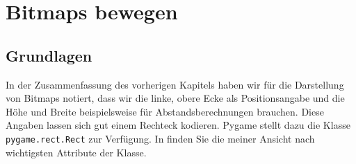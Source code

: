 \newpage
\section{Bitmaps bewegen}
\subsection{Grundlagen}
In der Zusammenfassung des vorherigen Kapitels haben wir für die Darstellung von Bitmaps notiert, dass wir die linke, obere Ecke als Positionsangabe und die Höhe und Breite beispielsweise für Abstandsberechnungen brauchen. Diese Angaben lassen sich gut einem Rechteck kodieren. Pygame stellt dazu die Klasse \texttt{pygame.rect.Rect} zur Verfügung. In  finden Sie die meiner Ansicht nach wichtigsten Attribute der Klasse.

